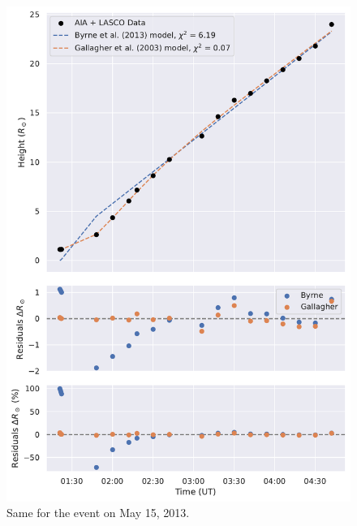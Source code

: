 \begin{figure}[!htp]
	\centering
	\includegraphics[width=0.8\hsize]{chapter2/figs/appendix/height_profile_residuals_aia_lasco_130515_01.pdf}
	\caption{Same for the event on May 15, 2013.}
\end{figure}


